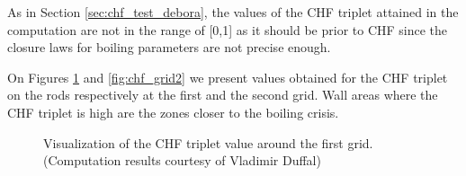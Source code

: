 \begin{note*}{}
As in Section \ref{sec:chf_test_debora}, the values of the CHF triplet attained in the computation are not in the range of [0,1] as it should be prior to CHF \cite{zhang_new_2022} since the closure laws for boiling parameters are not precise enough.
\end{note*}

On Figures \ref{fig:chf_grid1} and \ref{fig:chf_grid2} we present values obtained for the CHF triplet on the rods respectively at the first and the second grid. Wall areas where the CHF triplet is high are the zones closer to the boiling crisis.

\begin{figure}[!h]
\caption{Visualization of the CHF triplet value around the first grid. (Computation results courtesy of Vladimir Duffal)}
\label{fig:chf_grid1}
\end{figure} 


